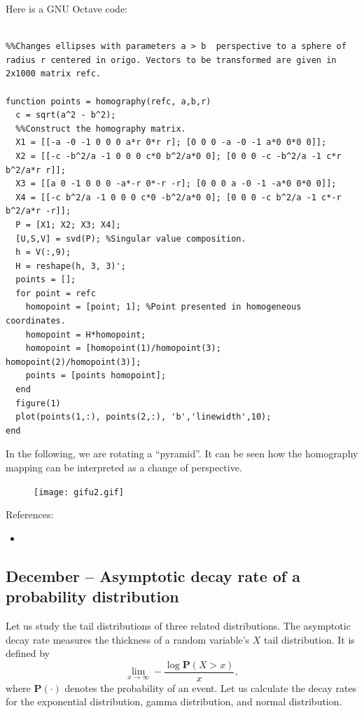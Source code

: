 \documentclass{article}
\begin{document}
Here is a GNU Octave code:
\begin{verbatim}

%%Changes ellipses with parameters a > b  perspective to a sphere of radius r centered in origo. Vectors to be transformed are given in 2x1000 matrix refc.

function points = homography(refc, a,b,r)
  c = sqrt(a^2 - b^2);
  %%Construct the homography matrix.
  X1 = [[-a -0 -1 0 0 0 a*r 0*r r]; [0 0 0 -a -0 -1 a*0 0*0 0]];
  X2 = [[-c -b^2/a -1 0 0 0 c*0 b^2/a*0 0]; [0 0 0 -c -b^2/a -1 c*r b^2/a*r r]];
  X3 = [[a 0 -1 0 0 0 -a*-r 0*-r -r]; [0 0 0 a -0 -1 -a*0 0*0 0]];
  X4 = [[-c b^2/a -1 0 0 0 c*0 -b^2/a*0 0]; [0 0 0 -c b^2/a -1 c*-r b^2/a*r -r]];
  P = [X1; X2; X3; X4];
  [U,S,V] = svd(P); %Singular value composition.
  h = V(:,9);
  H = reshape(h, 3, 3)';
  points = [];
  for point = refc
    homopoint = [point; 1]; %Point presented in homogeneous coordinates.
    homopoint = H*homopoint;
    homopoint = [homopoint(1)/homopoint(3); homopoint(2)/homopoint(3)];
    points = [points homopoint];
  end
  figure(1)
  plot(points(1,:), points(2,:), 'b','linewidth',10);
end

\end{verbatim}

In the following, we are rotating a ``pyramid''. It can be seen how the homography mapping can be interpreted as a change of perspective.

\begin{figure}
  \texttt{[image: gifu2.gif]}
\end{figure}

References:
\begin{itemize}
\item {}
\end{itemize}


\subsection{December – Asymptotic decay rate of a probability distribution}


Let us study the tail distributions of three related distributions. The asymptotic decay rate measures the thickness of a random variable's $X$ tail distribution. It is defined by
\begin{equation}
  \lim_{x \rightarrow \infty} -\frac{\log\textbf{P}(X > x)}{x}, \tag{1}
\end{equation}
where $\textbf{P}(\cdot)$ denotes the probability of an event. Let us calculate the decay rates for the exponential distribution, gamma distribution, and normal distribution.
\end{document}
